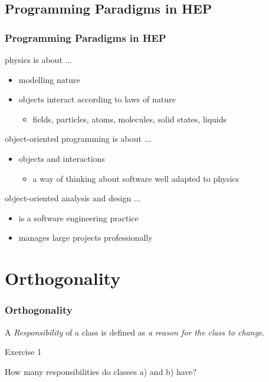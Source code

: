 \documentclass[9pt]{beamer}
\begin{document}
\subsection[OOP in HEP]{Programming Paradigms in HEP}
\begin{frame}
\frametitle{Programming Paradigms in HEP}
\normalsize
\begin{block}{physics is about ...}
  \begin{itemize}
  \item \alert<4->{modelling nature}
  \item objects interact according to laws of nature
    \begin{itemize}
    \item fields, particles, atoms, molecules, solid states, liquids
    \end{itemize}
  \end{itemize}
\end{block}
\vfill
\pause
\begin{block}{object-oriented programming is about ...}
  \begin{itemize}
  \item \alert<4->{objects and interactions}
    \begin{itemize}
    \item a way of thinking about software well adapted to
      physics
    \end{itemize}

  \end{itemize}
\end{block}
\vfill
\pause
\begin{block}{object-oriented analysis and design ...}
  \begin{itemize}
  \item is a software engineering practice
  \item \alert<4->{manages large projects professionally}
  \end{itemize}
\end{block}
\end{frame}

\section{Orthogonality}
\begin{frame}
  \frametitle{Orthogonality}
  \begin{definition}
    A \emph{Responsibility} of a class is defined as \emph{a reason for the class to change}.
  \end{definition}
  \vfill
  \begin{exampleblock}{Exercise 1}
    \begin{center}
      \Large
      How many responsibilities do classes a) and b) have?
    \end{center}

  \end{exampleblock}
  \vfill
\end{frame}
\end{document}
